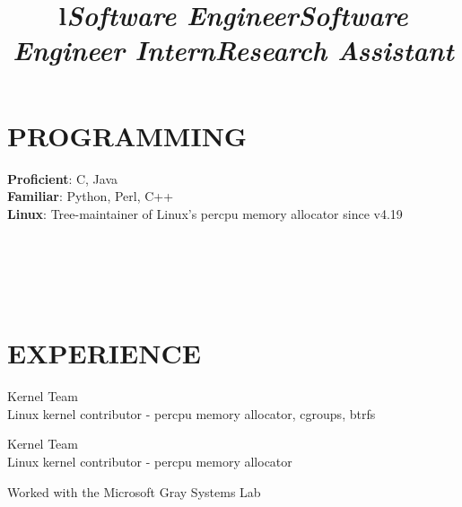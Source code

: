 \documentclass[margin,11pt]{res}
\begin{document}
\begin{resume}
\section{PROGRAMMING}

\textbf{Proficient}: C, Java\\
\textbf{Familiar}: Python, Perl, C++\\
\textbf{Linux}: Tree-maintainer of Linux's percpu memory allocator since v4.19

\begin{format}
\\
\title{l}\\
\body\\
\end{format}

\section{EXPERIENCE}
\title{\sl{Software Engineer}}
\begin{position}
Kernel Team\\
Linux kernel contributor - percpu memory allocator, cgroups, btrfs
\end{position}

\title{\sl{Software Engineer Intern}}
\begin{position}
Kernel Team\\
Linux kernel contributor - percpu memory allocator
\end{position}

\title{\sl{Research Assistant}}
\begin{position}
Worked with the Microsoft Gray Systems Lab
\end{position}


\end{resume}
\end{document}
